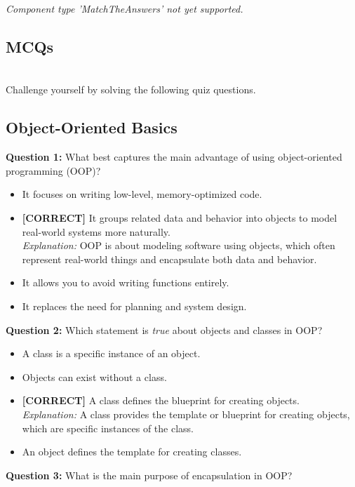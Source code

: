 \textit{Component type 'MatchTheAnswers' not yet supported.}

\subsection{MCQs}\label{E99f25gGckVKDrZUsgKEr}
\\
Challenge yourself by solving the following quiz questions.

\subsection*{Object-Oriented Basics}
\vspace{0.3cm}
\noindent
\textbf{Question 1:} What best captures the main advantage of using object-oriented programming (OOP)?
\\[0.2cm]
\begin{itemize}
 \item It focuses on writing low-level, memory-optimized code.
 \item \textbf{[CORRECT]} It groups related data and behavior into objects to model real-world systems more naturally.
\\[0.1cm]
\textit{Explanation:} 
OOP is about modeling software using objects, which often represent real-world things and encapsulate both data and behavior.
 \item It allows you to avoid writing functions entirely.
 \item It replaces the need for planning and system design.
\end{itemize}
\vspace{0.3cm}
\noindent
\textbf{Question 2:} Which statement is \emph{true} about objects and classes in OOP?
\\[0.2cm]
\begin{itemize}
 \item A class is a specific instance of an object.
 \item Objects can exist without a class.
 \item \textbf{[CORRECT]} A class defines the blueprint for creating objects.
\\[0.1cm]
\textit{Explanation:} 
A class provides the template or blueprint for creating objects, which are specific instances of the class.
 \item An object defines the template for creating classes.
\end{itemize}
\vspace{0.3cm}
\noindent
\textbf{Question 3:} What is the main purpose of encapsulation in OOP?
